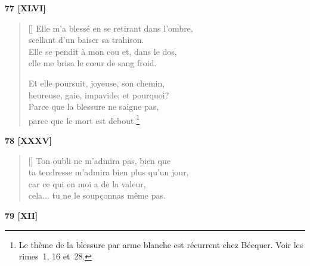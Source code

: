 \documentclass[a4paper,12pt]{book}
\begin{document}
\begin{center}
  \textbf{77 [XLVI]}
\end{center}

\settowidth{\versewidth}{Elle m'a blessé en se retirant dans l'ombre,}

\begin{verse}[\versewidth]
  Elle m'a blessé en se retirant dans l'ombre, \\
  scellant d'un baiser sa trahison. \\
  Elle se pendit à mon cou et, dans le dos, \\
  elle me brisa le cœur de sang froid.

  Et elle poursuit, joyeuse, son chemin, \\
  heureuse, gaie, impavide; et pourquoi? \\
  Parce que la blessure ne saigne pas, \\
  parce que le mort est debout.\footnote{Le thème de la blessure
  par arme blanche est récurrent chez Bécquer. Voir les rimes~1, 16
  et~28.}
\end{verse}

\bigskip

\begin{center}
  \textbf{78 [XXXV]}
\end{center}

\settowidth{\versewidth}{Ton oubli ne m'admira pas! Bien que d'un jour}

\begin{verse}[\versewidth]
  Ton oubli ne m'admira pas, bien que \\
  ta tendresse m'admira bien plus qu'un jour, \\
  car ce qui en moi a de la valeur, \\
  cela... tu ne le soupçonnas même pas.
\end{verse}

\bigskip

\begin{center}
  \textbf{79 [XII]}
\end{center}

\settowidth{\versewidth}{Petite, parce que tes yeux}
\end{document}
